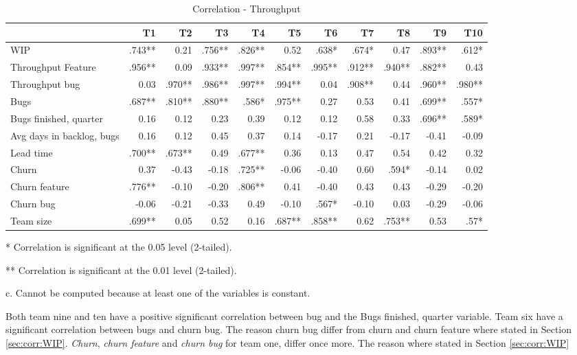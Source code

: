 \documentclass[UKenglish]{ifimaster}  %
\begin{document}
\begin{table}[!htbp]
 \begin{adjustwidth}{-1.5cm}{}
 \centering
 \begin{tabular}{|l|r|r|r|r|r|r|r|r|r|r|}
\hline
 & \bf{T1} & \bf{T2} & \bf{T3} & \bf{T4} & \bf{T5} & \bf{T6} & \bf{T7} & \bf{T8} & \bf{T9} & \bf{T10}\\ \hline
WIP &.743**& 0.21& .756**& .826**& 0.52& .638*& .674*& 0.47& .893**& .612*\\ \hline
Throughput Feature &.956**& 0.09& .933**& .997**& .854**& .995**& .912**& .940**& .882**& 0.43\\ \hline
Throughput bug &0.03& .970**& .986**& .997**& .994**& 0.04& .908**& 0.44& .960**& .980**\\ \hline
Bugs &.687**& .810**& .880**& .586*& .975**& 0.27& 0.53& 0.41& .699**& .557*\\ \hline
Bugs finished, quarter &0.16& 0.12& 0.23& 0.39& 0.12& 0.12& 0.58& 0.33& .696**& .589*\\ \hline
Avg days in backlog, bugs &0.16& 0.12& 0.45& 0.37& 0.14& -0.17& 0.21& -0.17& -0.41& -0.09\\ \hline
Lead time &.700**& .673**& 0.49& .677**& 0.36& 0.13& 0.47& 0.54& 0.42& 0.32\\ \hline
Churn &0.37& -0.43& -0.18& .725**& -0.06& -0.40& 0.60& .594*& -0.14& 0.02\\ \hline
Churn feature &.776**& -0.10& -0.20& .806**& 0.41& -0.40& 0.43& 0.43& -0.29& -0.20\\ \hline
Churn bug &-0.06& -0.21& -0.33& 0.49& -0.10& .567*& -0.10& 0.03& -0.29& -0.06\\ \hline
Team size &.699**
& 0.05& 0.52& 0.16& .687**
& .858**
& 0.62& .753**
& 0.53& .57*\\ \hline
\end{tabular}
 \caption{Correlation - Throughput}
 \label{corr:TP}
 \centerline {* Correlation is significant at the 0.05 level (2-tailed).}
\centerline{** Correlation is significant at the 0.01 level (2-tailed).}
\centerline{c. Cannot be computed because at least one of the variables is constant.}
\end{adjustwidth}
\end{table}

Both team nine and ten have a positive significant correlation between bug and the Bugs finished, quarter variable. Team six have a significant correlation between bugs and churn bug. The reason churn bug differ from churn and churn feature where stated in Section \ref{sec:corr:WIP}.  \textit{Churn}, \textit{churn feature} and \textit{churn bug} for team one, differ once more. The reason where stated in Section \ref{sec:corr:WIP} 
\end{document}
